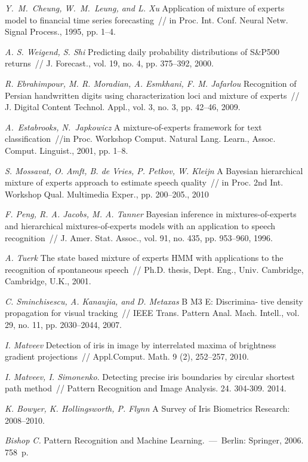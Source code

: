 \documentclass[12pt, twoside]{article}
\numberwithin{equation}{section}
\begin{document}
\begin{thebibliography}{99}
	\textit{Y.~M.~Cheung, W.~M.~Leung, and L. Xu} Application of mixture of experts model to financial time series forecasting~// in Proc. Int. Conf. Neural Netw. Signal Process., 1995, pp. 1--4.
	
	\textit{A. S. Weigend, S. Shi} Predicting daily probability distributions of S\&P500 returns~// J. Forecast., vol. 19, no. 4, pp. 375--392, 2000.
	
	\textit{R. Ebrahimpour, M. R. Moradian, A. Esmkhani, F. M. Jafarlou} Recognition of Persian handwritten digits using characterization loci and mixture of experts~// J. Digital Content Technol. Appl., vol. 3, no. 3, pp. 42–46, 2009.
	
	\textit{A.~Estabrooks, N.~Japkowicz} A mixture-of-experts framework for text classification~//in Proc. Workshop Comput. Natural Lang. Learn., Assoc. Comput. Linguist., 2001, pp. 1--8.
	
	\textit{S. Mossavat, O. Amft, B. de Vries, P. Petkov, W. Kleijn} A Bayesian hierarchical mixture of experts approach to estimate speech quality~// in Proc. 2nd Int. Workshop Qual. Multimedia Exper., pp. 200--205., 2010

	\textit{F. Peng, R. A. Jacobs, M. A. Tanner} Bayesian inference in mixtures-of-experts and hierarchical mixtures-of-experts models with an application to speech recognition~// J. Amer. Stat. Assoc., vol. 91, no. 435, pp. 953–960, 1996.
	
	\textit{A. Tuerk} The state based mixture of experts HMM with applications to the recognition of spontaneous speech~// Ph.D. thesis, Dept. Eng., Univ. Cambridge, Cambridge, U.K., 2001.
	
	\textit{C. Sminchisescu, A. Kanaujia, and D. Metaxas} B M3 E: Discrimina- tive density propagation for visual tracking~// IEEE Trans. Pattern Anal. Mach. Intell., vol. 29, no. 11, pp. 2030–2044, 2007.

	\textit{I. Matveev} Detection of iris in image by interrelated maxima of brightness gradient projections~// Appl.Comput. Math. 9 (2), 252–257, 2010.

	\textit{I. Matveev, I. Simonenko}. Detecting precise iris boundaries by circular shortest path method~// Pattern Recognition and Image Analysis. 24. 304-309. 2014.
	
	\textit{K. Bowyer, K. Hollingsworth, P. Flynn} A Survey of Iris Biometrics Research: 2008–2010.
	
	\textit{Bishop C.} Pattern Recognition and Machine Learning.~---~Berlin: Springer, 2006. 758~p.

 \end{thebibliography}
 
\end{document}

